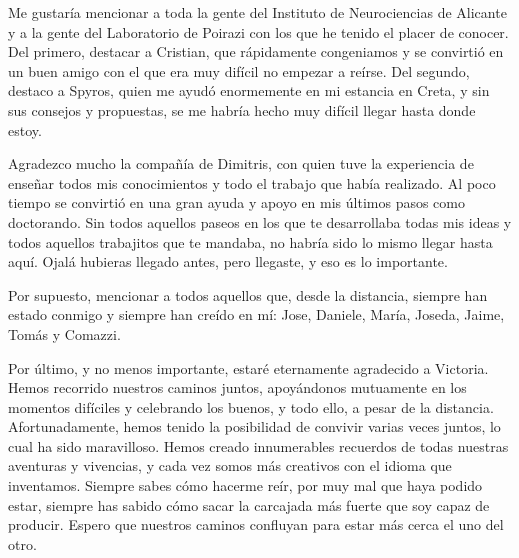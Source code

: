 \documentclass[../main.tex]{subfiles}
\begin{document}
Me gustaría mencionar a toda la gente del Instituto de Neurociencias de Alicante y a la gente del Laboratorio de Poirazi con los que he tenido el placer de conocer.
Del primero, destacar a Cristian, que rápidamente congeniamos y se convirtió en un buen amigo con el que era muy difícil no empezar a reírse.
Del segundo, destaco a Spyros, quien me ayudó enormemente en mi estancia en Creta, y sin sus consejos y propuestas, se me habría hecho muy difícil llegar hasta donde estoy.

Agradezco mucho la compañía de Dimitris, con quien tuve la experiencia de enseñar todos mis conocimientos y todo el trabajo que había realizado.
Al poco tiempo se convirtió en una gran ayuda y apoyo en mis últimos pasos como doctorando. Sin todos aquellos paseos en los que te desarrollaba todas mis ideas y todos aquellos trabajitos que te mandaba, no habría sido lo mismo llegar hasta aquí.
Ojalá hubieras llegado antes, pero llegaste, y eso es lo importante.

Por supuesto, mencionar a todos aquellos que, desde la distancia, siempre han estado conmigo y siempre han creído en mí: Jose, Daniele, María, Joseda, Jaime, Tomás y Comazzi.

Por último, y no menos importante, estaré eternamente agradecido a Victoria.
Hemos recorrido nuestros caminos juntos, apoyándonos mutuamente en los momentos difíciles y celebrando los buenos, y todo ello, a pesar de la distancia.
Afortunadamente, hemos tenido la posibilidad de convivir varias veces juntos, lo cual ha sido maravilloso. Hemos creado innumerables recuerdos de todas nuestras aventuras y vivencias, y cada vez somos más creativos con el idioma que inventamos.
Siempre sabes cómo hacerme reír, por muy mal que haya podido estar, siempre has sabido cómo sacar la carcajada más fuerte que soy capaz de producir.
Espero que nuestros caminos confluyan para estar más cerca el uno del otro.

\endgroup
\cleardoublepage
\end{document}
